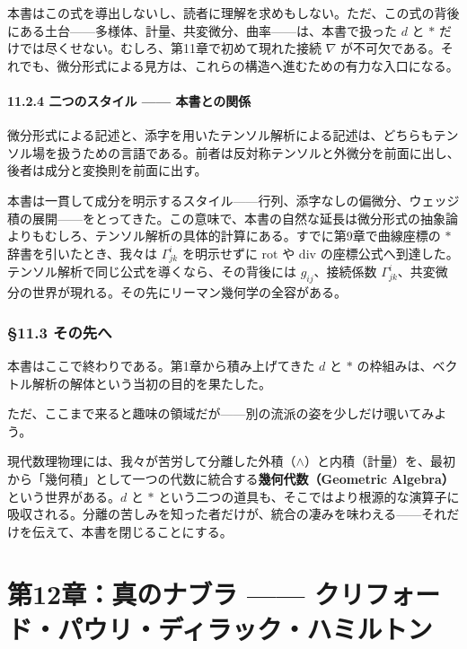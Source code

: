 \documentclass[a4paper,12pt,openany]{book}
\begin{document}
本書はこの式を導出しないし、読者に理解を求めもしない。ただ、この式の背後にある土台——多様体、計量、共変微分、曲率——は、本書で扱った
\(d\) と \(\ast\) だけでは尽くせない。むしろ、第11章で初めて現れた接続
\(\nabla\)
が不可欠である。それでも、微分形式による見方は、これらの構造へ進むための有力な入口になる。

\hypertarget{ux4e8cux3064ux306eux30b9ux30bfux30a4ux30eb-ux672cux66f8ux3068ux306eux95a2ux4fc2}{%
\subsubsection{11.2.4 二つのスタイル ——
本書との関係}\label{ux4e8cux3064ux306eux30b9ux30bfux30a4ux30eb-ux672cux66f8ux3068ux306eux95a2ux4fc2}}

微分形式による記述と、添字を用いたテンソル解析による記述は、どちらもテンソル場を扱うための言語である。前者は反対称テンソルと外微分を前面に出し、後者は成分と変換則を前面に出す。

本書は一貫して成分を明示するスタイル——行列、添字なしの偏微分、ウェッジ積の展開——をとってきた。この意味で、本書の自然な延長は微分形式の抽象論よりもむしろ、テンソル解析の具体的計算にある。すでに第9章で曲線座標の
\(\ast\) 辞書を引いたとき、我々は \(\Gamma^i_{jk}\) を明示せずに
\(\mathrm{rot}\) や \(\mathrm{div}\)
の座標公式へ到達した。テンソル解析で同じ公式を導くなら、その背後には
\(g_{ij}\)、接続係数
\(\Gamma^i_{jk}\)、共変微分の世界が現れる。その先にリーマン幾何学の全容がある。

\hypertarget{ux305dux306eux5148ux3078}{%
\subsection{§11.3 その先へ}\label{ux305dux306eux5148ux3078}}

本書はここで終わりである。第1章から積み上げてきた \(d\) と \(\ast\)
の枠組みは、ベクトル解析の解体という当初の目的を果たした。

ただ、ここまで来ると趣味の領域だが——別の流派の姿を少しだけ覗いてみよう。

現代数理物理には、我々が苦労して分離した外積（\(\wedge\)）と内積（計量）を、最初から「幾何積」として一つの代数に統合する\textbf{幾何代数（Geometric Algebra）}
という世界がある。\(d\) と \(\ast\)
という二つの道具も、そこではより根源的な演算子に吸収される。分離の苦しみを知った者だけが、統合の凄みを味わえる——それだけを伝えて、本書を閉じることにする。

\newpage

\hypertarget{ux7b2c12ux7ae0ux771fux306eux30caux30d6ux30e9-ux30afux30eaux30d5ux30a9ux30fcux30c9ux30d1ux30a6ux30eaux30c7ux30a3ux30e9ux30c3ux30afux30cfux30dfux30ebux30c8ux30f3}{%
\chapter{第12章：真のナブラ ——
クリフォード・パウリ・ディラック・ハミルトン}\label{ux7b2c12ux7ae0ux771fux306eux30caux30d6ux30e9-ux30afux30eaux30d5ux30a9ux30fcux30c9ux30d1ux30a6ux30eaux30c7ux30a3ux30e9ux30c3ux30afux30cfux30dfux30ebux30c8ux30f3}}
\end{document}
